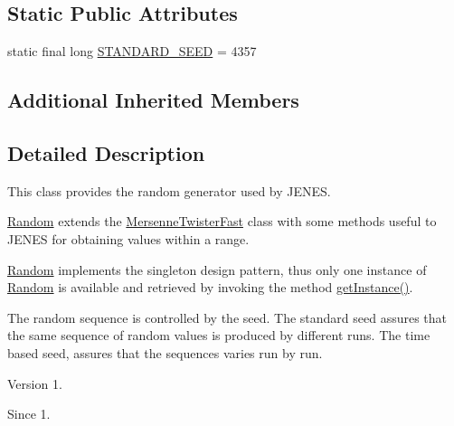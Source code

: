 \subsection*{Static Public Attributes}
\begin{DoxyCompactItemize}
\item 
static final long \hyperlink{classjenes_1_1utils_1_1_random_aee05c4e6476472dc9dc02d2fd94061b5}{S\-T\-A\-N\-D\-A\-R\-D\-\_\-\-S\-E\-E\-D} = 4357
\end{DoxyCompactItemize}
\subsection*{Additional Inherited Members}


\subsection{Detailed Description}
This class provides the random generator used by J\-E\-N\-E\-S. 

\hyperlink{classjenes_1_1utils_1_1_random}{Random} extends the \hyperlink{classjenes_1_1utils_1_1_mersenne_twister_fast}{Mersenne\-Twister\-Fast} class with some methods useful to J\-E\-N\-E\-S for obtaining values within a range. 

\hyperlink{classjenes_1_1utils_1_1_random}{Random} implements the singleton design pattern, thus only one instance of \hyperlink{classjenes_1_1utils_1_1_random}{Random} is available and retrieved by invoking the method \hyperlink{classjenes_1_1utils_1_1_random_aa8b8341f82ccf69de0b44c9f6f174820}{get\-Instance()}. 

The random sequence is controlled by the seed. The standard seed assures that the same sequence of random values is produced by different runs. The time based seed, assures that the sequences varies run by run. 

\begin{DoxyVersion}{Version}
1. 
\end{DoxyVersion}
\begin{DoxySince}{Since}
1. 
\end{DoxySince}


